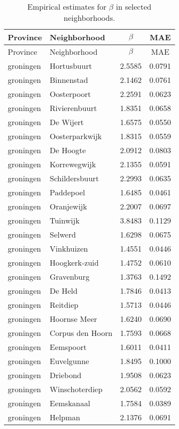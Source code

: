 \begin{longtable}{llcc}
\caption{Empirical estimates for $\beta$ in selected neighborhoods.} \label{tab:results}\\
\hline
Province & Neighborhood & $\beta$ & MAE \\
\hline
\endfirsthead
\hline
Province & Neighborhood & $\beta$ & MAE \\
\hline
\endhead
groningen & Hortusbuurt & 2.5585 & 0.0791 \\
groningen & Binnenstad & 2.1462 & 0.0761 \\
groningen & Oosterpoort & 2.2591 & 0.0623 \\
groningen & Rivierenbuurt & 1.8351 & 0.0658 \\
groningen & De Wijert & 1.6575 & 0.0550 \\
groningen & Oosterparkwijk & 1.8315 & 0.0559 \\
groningen & De Hoogte & 2.0912 & 0.0803 \\
groningen & Korrewegwijk & 2.1355 & 0.0591 \\
groningen & Schildersbuurt & 2.2993 & 0.0635 \\
groningen & Paddepoel & 1.6485 & 0.0461 \\
groningen & Oranjewijk & 2.2007 & 0.0697 \\
groningen & Tuinwijk & 3.8483 & 0.1129 \\
groningen & Selwerd & 1.6298 & 0.0675 \\
groningen & Vinkhuizen & 1.4551 & 0.0446 \\
groningen & Hoogkerk-zuid & 1.4752 & 0.0610 \\
groningen & Gravenburg & 1.3763 & 0.1492 \\
groningen & De Held & 1.7846 & 0.0413 \\
groningen & Reitdiep & 1.5713 & 0.0446 \\
groningen & Hoornse Meer & 1.6240 & 0.0690 \\
groningen & Corpus den Hoorn & 1.7593 & 0.0668 \\
groningen & Eemspoort & 1.6011 & 0.0411 \\
groningen & Euvelgunne & 1.8495 & 0.1000 \\
groningen & Driebond & 1.9508 & 0.0623 \\
groningen & Winschoterdiep & 2.0562 & 0.0592 \\
groningen & Eemskanaal & 1.7584 & 0.0389 \\
groningen & Helpman & 2.1376 & 0.0691 \\

\end{longtable}
